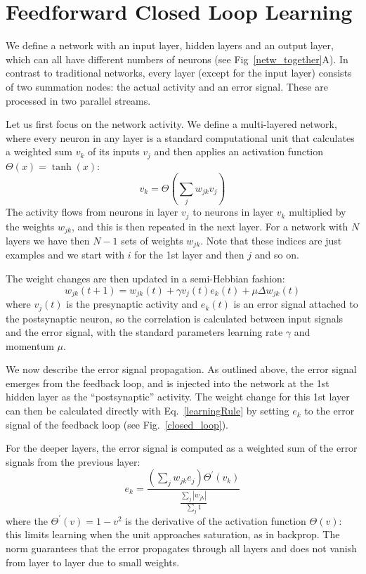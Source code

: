 \documentclass[Afour,sageh,times]{sagej}
\begin{document}
\section{Feedforward Closed Loop Learning}
We define a network with an input layer, hidden layers and an output
layer, which can all have different numbers of neurons (see
Fig~\ref{netw_together}A). In contrast to traditional
networks, every layer (except for the input layer) consists of two
summation nodes: the actual activity and an error signal. These
are processed in two parallel streams.

Let us first focus on the network activity. We define a multi-layered
network, where every neuron in any layer is a standard computational unit that
calculates a weighted sum $v_k$ of its inputs $v_j$ and then applies
an activation function $\Theta(x) = \tanh(x)$:
\begin{equation}
  v_k = \Theta\left( \sum_j w_{jk} v_{j} \right) \label{act_sum}
\end{equation}
The activity flows from neurons in layer $v_j$ to neurons in
layer $v_k$ multiplied by the weights $w_{jk}$, and this
is then repeated in the next layer. For a network with
$N$ layers we have then $N-1$ sets of weights $w_{jk}$. Note that these
indices are just examples and we start with $i$ for the 1st layer and then
$j$ and so on.

The weight changes are then updated in a semi-Hebbian fashion:
\begin{equation}
  w_{jk}(t+1) = w_{jk}(t) + \gamma v_j(t)  e_k(t) + \mu \Delta w_{jk}(t) \label{learningRule}
\end{equation}
where $v_j(t)$ is the presynaptic activity and $e_k(t)$ is an error
signal attached to the postsynaptic neuron, so the correlation is
calculated between input signals and the error signal, with the
standard parameters learning rate $\gamma$ and momentum $\mu$.

We now describe the error signal propagation. As outlined above, the
error signal emerges from the feedback loop, and is injected into the
network at the 1st hidden layer as the ``postsynaptic'' activity. The
weight change for this 1st layer can then be calculated directly with
Eq.~\ref{learningRule} by setting $e_k$ to the error signal of the
feedback loop (see Fig.~\ref{closed_loop}).

For the deeper layers, the error signal is computed as a weighted
sum of the error signals from the previous layer:
\begin{equation}
  e_k = \frac{\left( \sum_j w_{jk} e_{j} \right) \Theta^\prime (v_k) }{\frac{\sum_j {|w_{jk}|}}{\sum_j 1}}
  \label{deepError}
\end{equation}
where the $\Theta^\prime (v) = 1 - v^2$ is the derivative of the
activation function $\Theta(v)$: this limits learning when the unit
approaches saturation, as in backprop. The norm guarantees that
the error propagates through all layers and does not vanish from
layer to layer due to small weights.
\end{document}
